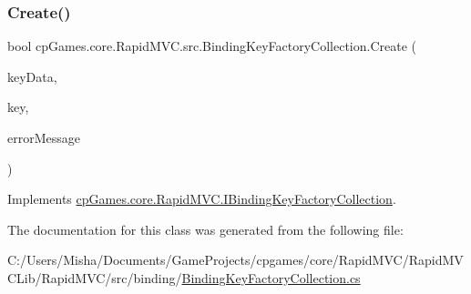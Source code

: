 \subsubsection{\texorpdfstring{Create()}{Create()}}
{\footnotesize\ttfamily bool cp\+Games.\+core.\+Rapid\+M\+V\+C.\+src.\+Binding\+Key\+Factory\+Collection.\+Create (\begin{DoxyParamCaption}\item[{object}]{key\+Data,  }\item[{out \mbox{\hyperlink{interfacecp_games_1_1core_1_1_rapid_m_v_c_1_1_i_binding_key}{I\+Binding\+Key}}}]{key,  }\item[{out string}]{error\+Message }\end{DoxyParamCaption})}



Implements \mbox{\hyperlink{interfacecp_games_1_1core_1_1_rapid_m_v_c_1_1_i_binding_key_factory_collection_a0e768b4fdf7855f5b5f9b7ac0c1865c8}{cp\+Games.\+core.\+Rapid\+M\+V\+C.\+I\+Binding\+Key\+Factory\+Collection}}.



The documentation for this class was generated from the following file\+:\begin{DoxyCompactItemize}
\item 
C\+:/\+Users/\+Misha/\+Documents/\+Game\+Projects/cpgames/core/\+Rapid\+M\+V\+C/\+Rapid\+M\+V\+C\+Lib/\+Rapid\+M\+V\+C/src/binding/\mbox{\hyperlink{_binding_key_factory_collection_8cs}{Binding\+Key\+Factory\+Collection.\+cs}}\end{DoxyCompactItemize}
